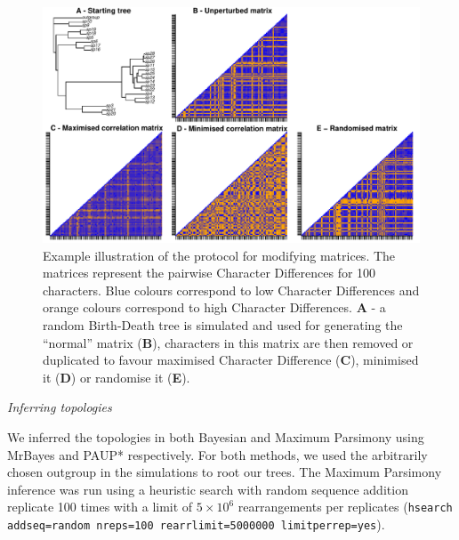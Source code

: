 \documentclass[12pt,letterpaper]{article}
\renewcommand{\subsection}[1]{%
\bigskip
\begin{center}
\begin{large}
\normalfont\itshape #1
\end{large}
\end{center}}
\begin{document}
\begin{figure}[!htbp]
\centering
   \includegraphics[width=1\textwidth]{Figures/Modif_matrix.pdf}
\caption{Example illustration of the protocol for modifying matrices. The matrices represent the pairwise Character Differences for 100 characters. Blue colours correspond to low Character Differences and orange colours correspond to high Character Differences. \textbf{A} - a random Birth-Death tree is simulated and used for generating the ``normal'' matrix (\textbf{B}), characters in this matrix are then removed or duplicated to favour maximised Character Difference (\textbf{C}), minimised it (\textbf{D}) or randomise it (\textbf{E}).}
\label{Fig:modif_matrix}
\end{figure}

\subsection{Inferring topologies}
We inferred the topologies in both Bayesian and Maximum Parsimony using MrBayes \citep[v3.2.6;][]{Ronquist2012mrbayes} and PAUP* \citep[v4.0a151;][]{swofford2001paup} respectively.
For both methods, we used the arbitrarily chosen outgroup in the simulations to root our trees.
The Maximum Parsimony inference was run using a heuristic search with random sequence addition replicate 100 times with a limit of $5\times10^6$ rearrangements per replicates (\texttt{hsearch addseq=random nreps=100 rearrlimit=5000000 limitperrep=yes}).
\end{document}
